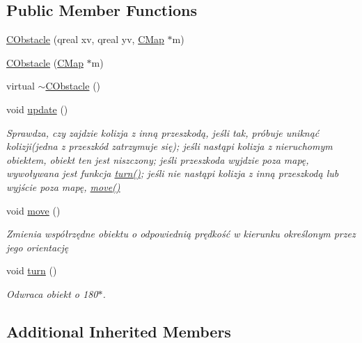 \subsection*{Public Member Functions}
\begin{DoxyCompactItemize}
\item 
\mbox{\hyperlink{class_c_obstacle_a3e105dc417eb5657e7cb1837259c235f}{C\+Obstacle}} (qreal xv, qreal yv, \mbox{\hyperlink{class_c_map}{C\+Map}} $\ast$m)
\item 
\mbox{\hyperlink{class_c_obstacle_ab1e0b16a38505ad38f085f7d87953c07}{C\+Obstacle}} (\mbox{\hyperlink{class_c_map}{C\+Map}} $\ast$m)
\item 
virtual \mbox{\hyperlink{class_c_obstacle_a10d5f9ec49321980b3cf46f868bc5f34}{$\sim$\+C\+Obstacle}} ()
\item 
void \mbox{\hyperlink{class_c_obstacle_a9aeb124d28bdef3430954f5e2b5ae0f0}{update}} ()
\begin{DoxyCompactList}\small\item\em Sprawdza, czy zajdzie kolizja z inną przeszkodą, jeśli tak, próbuje uniknąć kolizji(jedna z przeszkód zatrzymuje się); jeśli nastąpi kolizja z nieruchomym obiektem, obiekt ten jest niszczony; jeśli przeszkoda wyjdzie poza mapę, wywoływana jest funkcja \mbox{\hyperlink{class_c_obstacle_ae3aded0a2ac060a2124250a42ddacee4}{turn()}}; jeśli nie nastąpi kolizja z inną przeszkodą lub wyjście poza mapę, \mbox{\hyperlink{class_c_obstacle_a4b2e4989c993dd7f79cd66fd485c3c88}{move()}} \end{DoxyCompactList}\item 
void \mbox{\hyperlink{class_c_obstacle_a4b2e4989c993dd7f79cd66fd485c3c88}{move}} ()
\begin{DoxyCompactList}\small\item\em Zmienia współrzędne obiektu o odpowiednią prędkość w kierunku określonym przez jego orientację \end{DoxyCompactList}\item 
void \mbox{\hyperlink{class_c_obstacle_ae3aded0a2ac060a2124250a42ddacee4}{turn}} ()
\begin{DoxyCompactList}\small\item\em Odwraca obiekt o 180$\ast$. \end{DoxyCompactList}\end{DoxyCompactItemize}
\subsection*{Additional Inherited Members}


